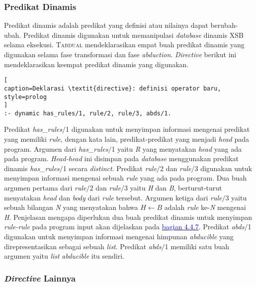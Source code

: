 \subsubsection{Predikat Dinamis}

Predikat dinamis adalah predikat yang definisi atau nilainya dapat berubah-ubah. Predikat dinamis digunakan untuk memanipulasi \textit{database} dinamis XSB selama eksekusi. \textsc{Tabdual} mendeklarasikan empat buah predikat dinamis yang digunakan selama fase transformasi dan fase \textit{abduction}. \textit{Directive} berikut ini mendeklarasikan keempat predikat dinamis yang digunakan. 
\\

\begin{lstlisting}[
caption=Deklarasi \textit{directive}: definisi operator baru,
style=prolog
]
:- dynamic has_rules/1, rule/2, rule/3, abds/1.
\end{lstlisting}

Predikat \textit{has\_rules$/$}1 digunakan untuk menyimpan informasi mengenai predikat yang memiliki \textit{rule}, dengan kata lain, predikat-predikat yang menjadi \textit{head} pada program. Argumen dari \textit{has\_rules$/$}1 yaitu \textit{R} yang menyatakan \textit{head} yang ada pada program. \textit{Head-head} ini disimpan pada \textit{database} menggunakan predikat dinamis \textit{has\_rules$/$}1 secara \textit{distinct}. Predikat \textit{rule$/$}2 dan \textit{rule$/$}3 digunakan untuk menyimpan informasi mengenai sebuah \textit{rule} yang ada pada program. Dua buah argumen pertama dari \textit{rule$/$}2 dan \textit{rule$/$}3 yaitu \textit{H} dan \textit{B}, berturut-turut menyatakan \textit{head} dan \textit{body} dari \textit{rule} tersebut. Argumen ketiga dari \textit{rule$/$}3 yaitu sebuah bilangan \textit{N} yang menyatakan bahwa \textit{$H \leftarrow B$} adalah \textit{rule} ke-\textit{N} mengenai \textit{H}.\label{rule2to3} Penjelasan mengapa diperlukan dua buah predikat dinamis untuk menyimpan \textit{rule-rule} pada program input akan dijelaskan pada \hyperref[subsec:add_indices]{\textcolor{blue}{bagian 4.4.7}}. Predikat \textit{abds$/$}1 digunakan untuk menyimpan informasi mengenai himpunan \textit{abducible} yang direpresentasikan sebagai sebuah \textit{list}. Predikat \textit{abds$/$}1 memiliki satu buah argumen yaitu \textit{list} \textit{abducible} itu sendiri.

\subsubsection{\textit{Directive} Lainnya}

